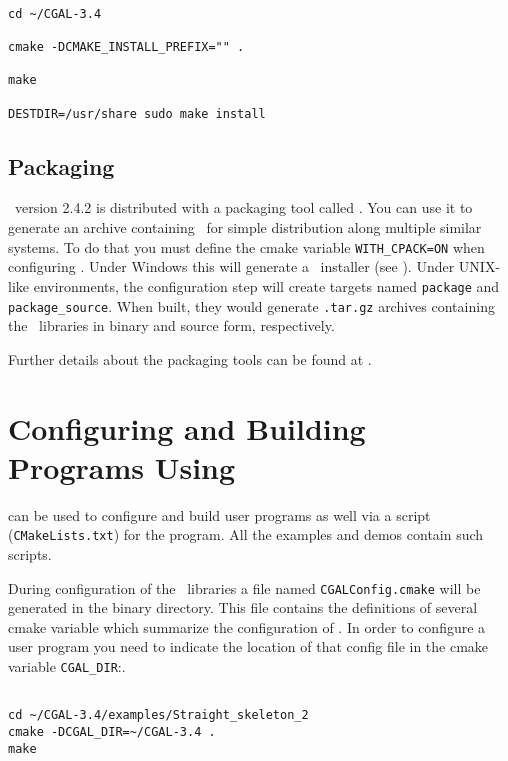 {\ccTexHtml{\scriptsize}{}
\begin{verbatim}

cd ~/CGAL-3.4

cmake -DCMAKE_INSTALL_PREFIX="" . 

make

DESTDIR=/usr/share sudo make install

\end{verbatim}
}

\subsection{Packaging \cgal}

\cmake\ version 2.4.2 is distributed with a packaging tool called \cpack. You can use it to generate an archive containing
\cgal\ for simple distribution along multiple similar systems. To do that you must define the cmake variable
{\tt WITH\_CPACK=ON} when configuring \cgal.
Under Windows this will generate a \nsis\ installer (see \nsispage).
Under UNIX-like environments, the configuration step will create targets named \texttt{package} and \texttt{package\_source}. When built, they would generate 
{\tt .tar.gz} archives containing the \cgal\ libraries in binary and source form, respectively.

Further details about the packaging tools can be found at \cpackpage.

\section{Configuring and Building Programs Using \cgal}

\cmake can be used to configure and build user programs as well via a \cmake script ({\tt CMakeLists.txt}) for the program.
All the examples and demos contain such \cmake scripts.

During configuration of the \cgal\ libraries a file named {\tt CGALConfig.cmake} will be generated in the binary directory. This file contains
the definitions of several cmake variable which summarize the configuration of \cgal. In order to configure a user program you need to indicate
the location of that config file in the cmake variable \texttt{CGAL\_DIR}:.

{\ccTexHtml{\scriptsize}{}
\begin{verbatim}

cd ~/CGAL-3.4/examples/Straight_skeleton_2
cmake -DCGAL_DIR=~/CGAL-3.4 .
make

\end{verbatim}
}

